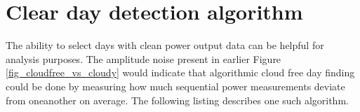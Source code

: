 

         
     





\section{Clear day detection algorithm}
\label{clearskyalgo_chapter}
The ability to select days with clean power output data can be helpful for analysis purposes. The amplitude noise present in earlier Figure \ref{fig_cloudfree_vs_cloudy} would indicate that algorithmic cloud free day finding could be done by measuring how much sequential power measurements deviate from oneanother on average. The following listing describes one such algorithm.

